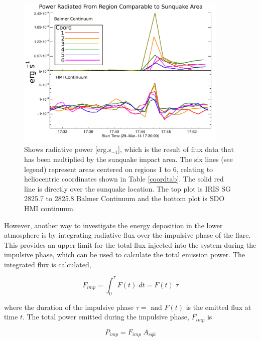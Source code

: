 \begin{figure}[H]
  \begin{center}
  \includegraphics[width=0.9\textwidth]{29-Mar-14-A_sqk-Power-Ladder-Balm-HMI-Only}
  \end{center}
  \caption{Shows radiative power [erg.s$_{-1}$], which is the result of flux data that has been multiplied by the sunquake impact area. The six lines (see legend) represent areas centered on regions 1 to 6, relating to heliocentric coordinates shown in Table \ref{coordtab}. The solid red line is directly over the sunquake location. The top plot is IRIS SG  2825.7 to 2825.8 Balmer Continuum and the bottom plot is SDO HMI continuum.}\label{powerladder-balm-hmi-only}
\end{figure}


However, another way to investigate the energy deposition in the lower atmosphere is by integrating radiative flux over the impulsive phase of the flare. This provides an upper limit for the total flux injected into the system during the impulsive phase, which can be used to calculate the total emission power. The integrated flux is calculated,

\begin{equation}
F_{imp} = \int_{0}^{\tau} F(t) \; dt = F(t) \; \tau
\end{equation}\label{f-imp}
 
where the duration of the impulsive phase $\tau = $ and $F(t)$ is the emitted flux at time $t$. The total power emitted during the impulsive phase, $F_{imp}$ is

\begin{equation}
P_{imp}=F_{imp} \; A_{sqk}
\end{equation}\label{e-imp}

